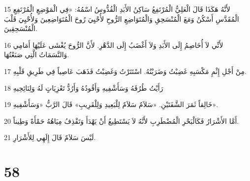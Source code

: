 \par 15 لأَنَّهُ هَكَذَا قَالَ الْعَلِيُّ الْمُرْتَفِعُ سَاكِنُ الأَبَدِ الْقُدُّوسُ اسْمُهُ: «فِي الْمَوْضِعِ الْمُرْتَفِعِ الْمُقَدَّسِ أَسْكُنُ وَمَعَ الْمُنْسَحِقِ وَالْمُتَوَاضِعِ الرُّوحِ لأُحْيِيَ رُوحَ الْمُتَوَاضِعِينَ وَلأُحْيِيَ قَلْبَ الْمُنْسَحِقِينَ.
\par 16 لأَنِّي لاَ أُخَاصِمُ إِلَى الأَبَدِ وَلاَ أَغْضَبُ إِلَى الدَّهْرِ. لأَنَّ الرُّوحَ يُغْشَى عَلَيْهَا أَمَامِي وَالنَّسَمَاتُ الَّتِي صَنَعْتُهَا.
\par 17 مِنْ أَجْلِ إِثْمِ مَكْسَبِهِ غَضِبْتُ وَضَرَبْتُهُ. اسْتَتَرْتُ وَغَضِبْتُ فَذَهَبَ عَاصِياً فِي طَرِيقِ قَلْبِهِ.
\par 18 رَأَيْتُ طُرُقَهُ وَسَأَشْفِيهِ وَأَقُودُهُ وَأَرُدُّ تَعْزِيَاتٍ لَهُ وَلِنَائِحِيهِ
\par 19 خَالِقاً ثَمَرَ الشَّفَتَيْنِ. «سَلاَمٌ سَلاَمٌ لِلْبَعِيدِ وَلِلْقَرِيبِ» قَالَ الرَّبُّ «وَسَأَشْفِيهِ».
\par 20 أَمَّا الأَشْرَارُ فَكَالْبَحْرِ الْمُضْطَرِبِ لأَنَّهُ لاَ يَسْتَطِيعُ أَنْ يَهْدَأَ وَتَقْذِفُ مِيَاهُهُ حَمْأَةً وَطِيناً.
\par 21 لَيْسَ سَلاَمٌ قَالَ إِلَهِي لِلأَشْرَارِ.

\chapter{58}

